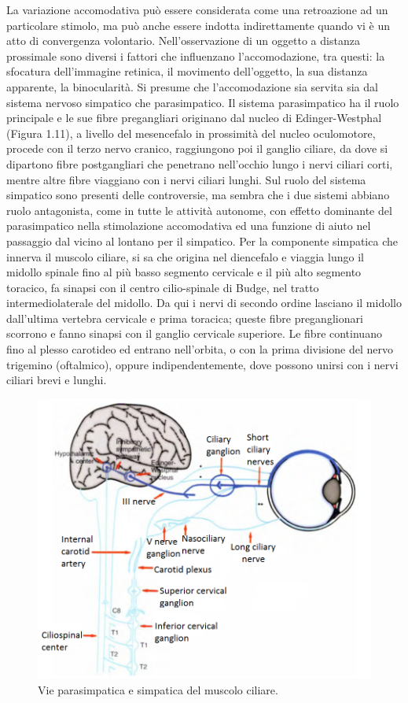 La variazione accomodativa può essere considerata come una retroazione ad un particolare stimolo, ma può anche essere indotta indirettamente quando vi è un atto di convergenza volontario. Nell’osservazione di un oggetto a distanza prossimale sono diversi i fattori che influenzano l’accomodazione, tra questi: la sfocatura dell’immagine retinica, il movimento dell’oggetto, la sua distanza apparente, la binocularità. Si presume che l’accomodazione sia servita sia dal sistema nervoso simpatico che parasimpatico. Il sistema parasimpatico ha il ruolo principale e le sue fibre pregangliari originano dal nucleo di Edinger-Westphal (Figura 1.11), a livello del mesencefalo in prossimità del nucleo oculomotore, procede con il terzo nervo cranico, raggiungono poi il ganglio ciliare, da dove si dipartono fibre postgangliari che penetrano nell’occhio lungo i nervi ciliari corti, mentre altre fibre viaggiano con i nervi ciliari lunghi. Sul ruolo del sistema simpatico sono presenti delle controversie, ma sembra che i due sistemi abbiano ruolo antagonista, come in tutte le attività autonome, con effetto dominante del parasimpatico nella stimolazione accomodativa ed una funzione di aiuto nel passaggio dal vicino al lontano per il simpatico. Per la componente simpatica che innerva il muscolo ciliare, si sa che origina nel diencefalo e viaggia lungo il midollo spinale fino al più basso segmento cervicale e il più alto segmento toracico, fa sinapsi con il centro cilio-spinale di Budge, nel tratto intermediolaterale del midollo. Da qui i nervi di secondo ordine lasciano il midollo dall’ultima vertebra cervicale e prima toracica; queste fibre preganglionari scorrono e fanno sinapsi con il ganglio cervicale superiore. Le fibre continuano fino al plesso carotideo ed entrano nell’orbita, o con la prima divisione del nervo trigemino (oftalmico), oppure indipendentemente, dove possono unirsi con i nervi ciliari brevi e lunghi\cite{bib18}.

\begin{figure}[h!]
	\centering
	\includegraphics[scale=0.70]{source/immagini/accomodazione.png}
	\caption[Vie parasimpatica e simpatica del muscolo ciliare]{Vie parasimpatica e simpatica del muscolo ciliare.}
	\label{fig:test12}
\end{figure}

